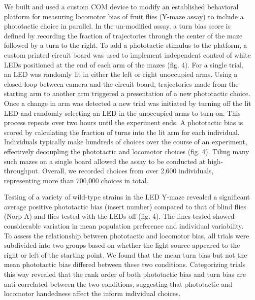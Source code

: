 \documentclass[10pt]{article}
\begin{document}
\begin{multicols}{2}
We built and used a custom COM device to modify an established behavioral platform for measuring locomotor bias of fruit flies (Y-maze assay) \cite{Buchanan_Neuronal_2015,Ayroles_Behavioral_2015} to include a phototactic choice in parallel. In the un-modified assay, a turn bias score is defined by recording the fraction of trajectories through the center of the maze followed by a turn to the right. To add a phototactic stimulus to the platform, a custom printed circuit board was used to implement independent control of white LEDs positioned at the end of each arm of the mazes (fig. 4). For a single trial, an LED was randomly lit in either the left or right unoccupied arms. Using a closed-loop between camera and the circuit board, trajectories made from the starting arm to another arm triggered a presentation of a new phototactic choice. Once a change in arm was detected a new trial was initiated by turning off the lit LED and randomly selecting an LED in the unoccupied arms to turn on. This process repeats over two hours until the experiment ends. A phototactic bias is scored by calculating the fraction of turns into the lit arm for each individual. Individuals typically make hundreds of choices over the course of an experiment, effectively decoupling the phototactic and locomotor choices (fig. 4). Tiling many such mazes on a single board allowed the assay to be conducted at high-throughput. Overall, we recorded choices from over 2,600 individuals, representing more than 700,000 choices in total.

Testing of a variety of wild-type strains in the LED Y-maze revealed a significant average positive phototactic bias (insert number) compared to that of blind flies (Norp-A) and flies tested with the LEDs off (fig. 4). The lines tested showed considerable variation in mean population preference and individual variability. To assess the relationship between phototactic and locomotor bias, all trials were subdivided into two groups based on whether the light source appeared to the right or left of the starting point. We found that the mean turn bias but not the mean phototactic bias differed between these two conditions. Categorizing trials this way revealed that the rank order of both phototactic bias and turn bias are anti-correlated between the two conditions, suggesting that phototactic and locomotor handedness affect the inform individual choices. 


\end{multicols}
\end{document}
